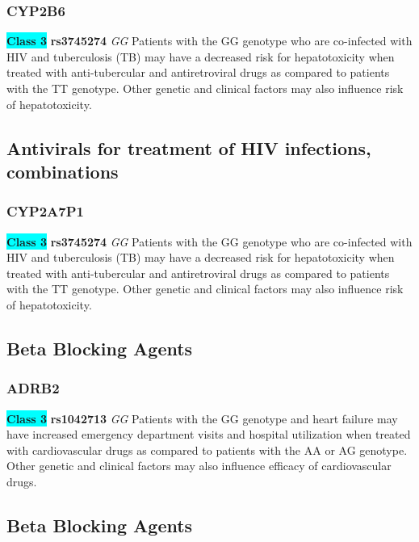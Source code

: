 \documentclass{book}
\begin{document}
\subsubsection{ CYP2B6 }

\begin{center}
\textbf{\colorbox{cyan} {Class 3}} \textbf{ rs3745274 } \textit{ GG }
Patients with the GG genotype who are co-infected with HIV and tuberculosis (TB) may have a decreased risk for hepatotoxicity when treated with anti-tubercular and antiretroviral drugs as compared to patients with the TT genotype. Other genetic and clinical factors may also influence risk of hepatotoxicity.


\end{center}\subsection{ Antivirals for treatment of HIV infections, combinations }


\subsubsection{ CYP2A7P1 }

\begin{center}
\textbf{\colorbox{cyan} {Class 3}} \textbf{ rs3745274 } \textit{ GG }
Patients with the GG genotype who are co-infected with HIV and tuberculosis (TB) may have a decreased risk for hepatotoxicity when treated with anti-tubercular and antiretroviral drugs as compared to patients with the TT genotype. Other genetic and clinical factors may also influence risk of hepatotoxicity.


\end{center}\subsection{ Beta Blocking Agents }


\subsubsection{ ADRB2 }

\begin{center}
\textbf{\colorbox{cyan} {Class 3}} \textbf{ rs1042713 } \textit{ GG }
Patients with the GG genotype and heart failure may have increased emergency department visits and hospital utilization when treated with cardiovascular drugs as compared to patients with the AA or AG genotype. Other genetic and clinical factors may also influence efficacy of cardiovascular drugs.


\end{center}\subsection{ Beta Blocking Agents }
\end{document}
